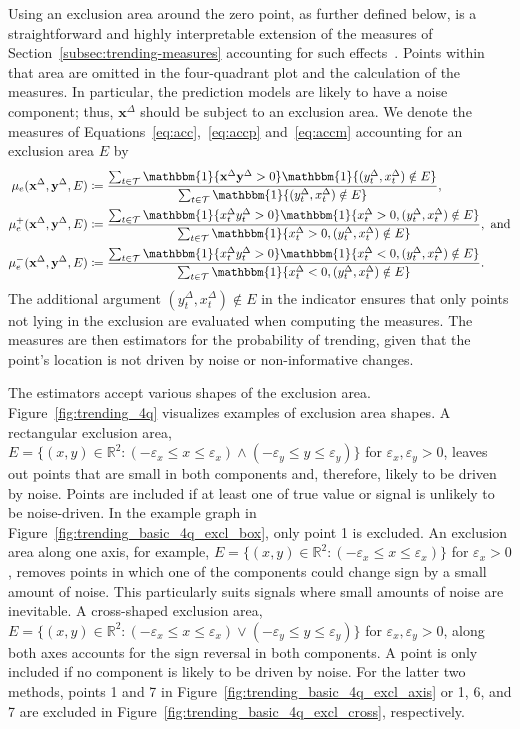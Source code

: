 \documentclass[pdflatex]{sn-jnl}
\theoremstyle{plain}%
\theoremstyle{definition}
\newcommand{\ind}[1]{\mathbbm{1}\{#1\}}
\newcommand{\R}{\mathbb{R}}
\newcommand{\diffx}{\mathbf{x}^{\Delta}}
\newcommand{\diffy}{\mathbf{y}^{\Delta}}
\newcommand{\diffxt}[1][t]{x^{\Delta}_{#1}}
\newcommand{\diffyt}[1][t]{y^{\Delta}_{#1}}
\newcommand{\acc}{\mu}
\newcommand{\acceps}[1][e]{\acc_{#1}} %
\newcommand{\accpeps}[1][e]{\acceps[#1]^+}
\newcommand{\accmeps}[1][e]{\acceps[#1]^-}
\begin{document}
Using an exclusion area around the zero point, as further defined below, is a straightforward and highly interpretable extension of the measures of Section~\ref{subsec:trending-measures} accounting for such effects~\citep[see, e.g.,][]{Saugel2015,Critchley2010}.
Points within that area are omitted in the four-quadrant plot and the calculation of the measures.
In particular, the prediction models are likely to have a noise component; thus, $\diffx$ should be subject to an exclusion area.
We denote the measures of Equations~\eqref{eq:acc},~\eqref{eq:accp} and~\eqref{eq:accm} accounting for an exclusion area $E$ by
\begin{align}
    \acceps (\diffx, \diffy, E) &\coloneqq \frac{\sum_{t \in \mathcal{T}} \ind{\diffx \diffy > 0} \ind{(\diffyt, \diffxt) \notin E}}{\sum_{t \in \mathcal{T}} \ind{(\diffyt, \diffxt) \notin E}},\label{eq:acceps}\\
    \accpeps (\diffx, \diffy, E) &\coloneqq \frac{\sum_{t \in \mathcal{T}} \ind{\diffxt \diffyt > 0} \ind{\diffxt > 0, (\diffyt, \diffxt) \notin E}}{\sum_{t \in \mathcal{T}} \ind{\diffxt > 0, (\diffyt, \diffxt) \notin E}}, \ \text{and} \label{eq:accpeps}\\
    \accmeps (\diffx, \diffy, E) &\coloneqq \frac{\sum_{t \in \mathcal{T}} \ind{\diffxt \diffyt > 0} \ind{\diffxt < 0, (\diffyt, \diffxt) \notin E}}{\sum_{t \in \mathcal{T}} \ind{\diffxt < 0, (\diffyt, \diffxt) \notin E}}. \label{eq:accmeps}
\end{align}
The additional argument $(\diffyt, \diffxt) \notin E$ in the indicator ensures that only points not lying in the exclusion are evaluated when computing the measures.
The measures are then estimators for the probability of trending, given that the point's location is not driven by noise or non-informative changes.

The estimators accept various shapes of the exclusion area.
Figure~\ref{fig:trending_4q} visualizes examples of exclusion area shapes.
A rectangular exclusion area, $E = \{(x, y) \in \R^2: (-\varepsilon_x \leq x \leq \varepsilon_x) \land (-\varepsilon_y \leq y \leq \varepsilon_y) \}$ for $\varepsilon_x, \varepsilon_y > 0$, leaves out points that are small in both components and, therefore, likely to be driven by noise.
Points are included if at least one of true value or signal is unlikely to be noise-driven.
In the example graph in Figure~\ref{fig:trending_basic_4q_excl_box}, only point 1 is excluded.
An exclusion area along one axis, for example, $E = \{(x, y) \in \R^2: (-\varepsilon_x \leq x \leq \varepsilon_x)\}$ for $\varepsilon_x > 0$, removes points in which one of the components could change sign by a small amount of noise.
This particularly suits signals where small amounts of noise are inevitable.
A cross-shaped exclusion area, $E = \{(x, y) \in \R^2: (-\varepsilon_x \leq x \leq \varepsilon_x) \lor (-\varepsilon_y \leq y \leq \varepsilon_y) \}$ for $\varepsilon_x, \varepsilon_y > 0$, along both axes accounts for the sign reversal in both components.
A point is only included if no component is likely to be driven by noise.
For the latter two methods, points 1 and 7 in Figure~\ref{fig:trending_basic_4q_excl_axis} or 1, 6, and 7 are excluded in Figure~\ref{fig:trending_basic_4q_excl_cross}, respectively.
\end{document}
